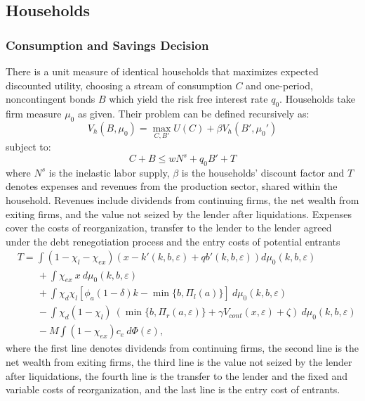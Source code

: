 \documentclass[12pt]{article}
\begin{document}
\subsection{Households}\label{sec:hh}
\subsubsection{Consumption and Savings Decision} \label{sec:Cons and Savings decision}
There is a unit measure of identical households that maximizes expected discounted utility, choosing a stream of consumption $C$ and one-period, noncontingent bonds $B$ which yield the risk free interest rate $q_0$. Households take firm measure $\mu_0$ as given. Their problem can be defined recursively as: 
\begin{equation} \label{eq:U_max}
V_h(B, \mu_0) = \max_{C,B'} U(C) + \beta V_h(B',\mu_0')
\end{equation}  
subject to: 
\begin{equation} \label{eq:const_hh}
C + B \leq w N^s + q_0 B' + T
\end{equation} 
where $N^s$ is the inelastic labor supply, $\beta$ is the households' discount factor and $T$ denotes expenses and revenues from the production sector, shared within the household. Revenues include dividends from continuing firms, the net wealth from exiting firms, and the value not seized by the lender after liquidations. Expenses cover the costs of reorganization, transfer to the lender to the lender agreed under the debt renegotiation process and the entry costs of potential entrants
\begin{equation*} \label{eq:T}
    \begin{split}
        & T = \int (1 - \chi_l - \chi_{ex}) \left( x - k'(k,b,\varepsilon) + qb'(k,b,\varepsilon) \right) d \mu_0(k,b,\varepsilon) \\
        & \qquad + \int \chi_{ex} \ x \ d \mu_0(k,b,\varepsilon) \\
        & \qquad + \int \chi_d \chi_{l} [ \phi_a (1-\delta) k -  \min\{b, \Pi_{l}(a) \} ] \ d \mu_0(k,b,\varepsilon)  \\
        & \qquad  - \int \chi_d (1-\chi_{l}) \ (\min\{b, \Pi_r(a,\varepsilon)  \} + \gamma V_{cont} (x, \varepsilon) + \zeta) \ d \mu_0(k,b,\varepsilon) \\
        & \qquad   - M \int (1-\chi_{ex}) c_e \ d \Phi(\varepsilon),
    \end{split}
\end{equation*}
where the first line denotes dividends from continuing firms, the second line is the net wealth from exiting firms, the third line is the value not seized by the lender after liquidations, the fourth line is the transfer to the lender and the fixed and variable costs of reorganization, and the last line is the entry cost of entrants.
\end{document}

